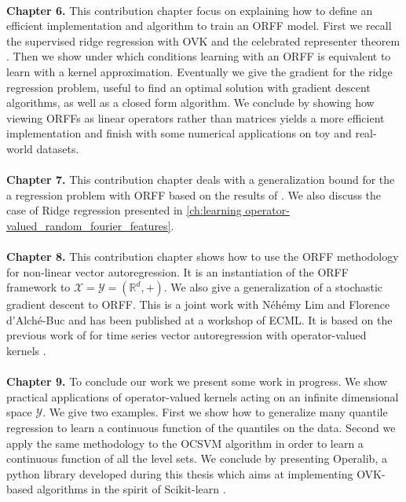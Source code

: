 \paragraph{}
\textbf{Chapter 6.}
This contribution chapter focus on explaining how to define an efficient
implementation and algorithm to train an \acs{ORFF} model. First we recall
the supervised ridge regression with \acs{OVK} and the celebrated representer
theorem \citep{Wahba90}. Then we show under which conditions learning with an
\acs{ORFF} is equivalent to learn with a kernel approximation. Eventually
we give the gradient for the ridge regression problem, useful to find an
optimal solution with gradient descent algorithms, as well as a closed form
algorithm.  We conclude by showing how viewing \acsp{ORFF} as linear operators
rather than matrices yields a more efficient implementation and finish with
some numerical applications on toy and real-world datasets.

\paragraph{}
\textbf{Chapter 7.}
This contribution chapter deals with a generalization bound for the a
regression problem with ORFF based on the results of \citet{rahimi2009weighted,
maurer2016vector}.  We also discuss the case of Ridge regression presented in
\cref{ch:learning operator-valued_random_fourier_features}.

\paragraph{}
\textbf{Chapter 8.}
This contribution chapter shows how to use the \acs{ORFF} methodology for
non-linear vector autoregression. It is an instantiation of the \acs{ORFF}
framework to $\mathcal{X}=\mathcal{Y}=\left(\mathbb{R}^d, +\right)$. We also
give a generalization of a stochastic gradient descent \citep{dai2014scalable}
to \acs{ORFF}. This is a joint work with N\'eh\'emy Lim and Florence
d'Alch\'e-Buc and has been published at a workshop of \acs{ECML}. It is based
on the previous work of \citet{Lim2015} for time series vector autoregression
with operator-valued kernels \cite{brault2016scaling}.

\paragraph{}
\textbf{Chapter 9.}
To conclude our work we present some work in progress. We show practical
applications of operator-valued kernels acting on an infinite dimensional space
$\mathcal{Y}$. We give two examples. First we show how to generalize many
quantile regression to learn a continuous function of the quantiles on the
data. Second we apply the same methodology to the \acf{OCSVM} algorithm in
order to learn a continuous function of all the level sets. We conclude by
presenting Operalib, a python library developed during this thesis which aims
at implementing \acs{OVK}-based algorithms in the spirit of Scikit-learn
\citep{pedregosa2011scikit}.



